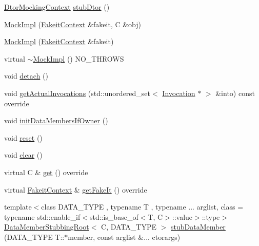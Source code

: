 \begin{DoxyCompactItemize}
\item 
\mbox{\hyperlink{classfakeit_1_1DtorMockingContext}{Dtor\+Mocking\+Context}} \mbox{\hyperlink{classfakeit_1_1MockImpl_ae64cb908c91a96faefbf0fabac948f29}{stub\+Dtor}} ()
\item 
\mbox{\hyperlink{classfakeit_1_1MockImpl_aeabb99e36f2ef5fea7856db165fe01d3}{Mock\+Impl}} (\mbox{\hyperlink{structfakeit_1_1FakeitContext}{Fakeit\+Context}} \&fakeit, C \&obj)
\item 
\mbox{\hyperlink{classfakeit_1_1MockImpl_ae6f86001c16b110046453433ba2d36e8}{Mock\+Impl}} (\mbox{\hyperlink{structfakeit_1_1FakeitContext}{Fakeit\+Context}} \&fakeit)
\item 
virtual \mbox{\hyperlink{classfakeit_1_1MockImpl_aafbd9e9c1f6691f7cee440c52ae07220}{$\sim$\+Mock\+Impl}} () N\+O\+\_\+\+T\+H\+R\+O\+WS
\item 
void \mbox{\hyperlink{classfakeit_1_1MockImpl_a48e09b74451cf9c435aab31b077cce26}{detach}} ()
\item 
void \mbox{\hyperlink{classfakeit_1_1MockImpl_a04c3121eb7d380226f1beabf4b18ee82}{get\+Actual\+Invocations}} (std\+::unordered\+\_\+set$<$ \mbox{\hyperlink{structfakeit_1_1Invocation}{Invocation}} $\ast$ $>$ \&into) const override
\item 
void \mbox{\hyperlink{classfakeit_1_1MockImpl_ad403c33f4734e31196ead952fc4c4805}{init\+Data\+Members\+If\+Owner}} ()
\item 
void \mbox{\hyperlink{classfakeit_1_1MockImpl_aad69a9c36fc64d0890f21ff15318a206}{reset}} ()
\item 
void \mbox{\hyperlink{classfakeit_1_1MockImpl_a3985505d2ec7bd50a5d71f155c5ae458}{clear}} ()
\item 
virtual C \& \mbox{\hyperlink{classfakeit_1_1MockImpl_a8f287e857fde9a0941c618ff5459bd88}{get}} () override
\item 
virtual \mbox{\hyperlink{structfakeit_1_1FakeitContext}{Fakeit\+Context}} \& \mbox{\hyperlink{classfakeit_1_1MockImpl_a1b51dd1918a32ec5d450fc804ad37e63}{get\+Fake\+It}} () override
\item 
{\footnotesize template$<$class D\+A\+T\+A\+\_\+\+T\+Y\+PE , typename T , typename ... arglist, class  = typename std\+::enable\+\_\+if$<$std\+::is\+\_\+base\+\_\+of$<$\+T, C$>$\+::value$>$\+::type$>$ }\\\mbox{\hyperlink{classfakeit_1_1DataMemberStubbingRoot}{Data\+Member\+Stubbing\+Root}}$<$ C, D\+A\+T\+A\+\_\+\+T\+Y\+PE $>$ \mbox{\hyperlink{classfakeit_1_1MockImpl_acaa4bcb3984d3ca5fd1ecb3095393951}{stub\+Data\+Member}} (D\+A\+T\+A\+\_\+\+T\+Y\+PE T\+::$\ast$member, const arglist \&... ctorargs)

\end{DoxyCompactItemize}
